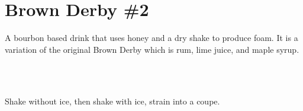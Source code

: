 \section[Brown Derby \#2]{
    Brown Derby \#2
}

\begin{recipestats}[
        servings=1,
        preptime=5 \minute,
        source=,
        original=\citefield{cocktailSeminars2021}{title} \cite{cocktailSeminars2021},
    ]
\end{recipestats}

\begin{recipeabstract}
    A bourbon based drink that uses honey and a dry shake to produce foam.
    It is a variation of the original Brown Derby which is rum, lime juice,
    and maple syrup.
\end{recipeabstract}

\begin{ingredientcolumns}[1]
    \begin{ingredientblock}
        \\
        \\
    \end{ingredientblock}
\end{ingredientcolumns}

\begin{preparation}
\item Shake without ice, then shake with ice, strain into a coupe.
\end{preparation}

\recipeend
